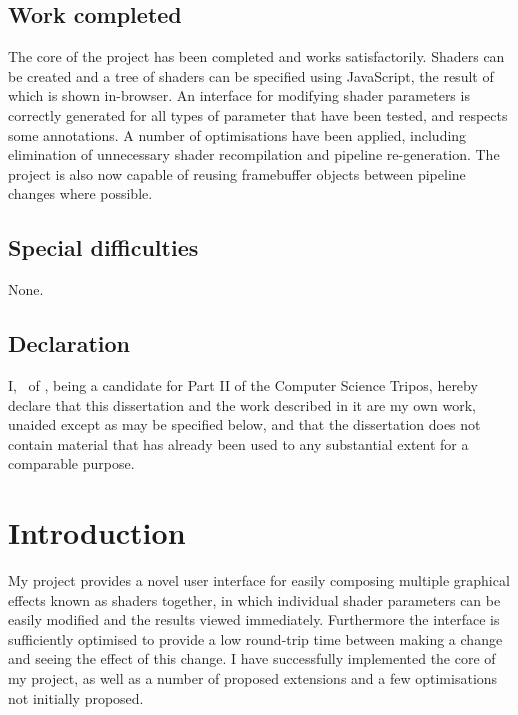 \documentclass[12pt,twoside,notitlepage]{report}
\begin{document}
\section*{Work completed}
The core of the project has been completed and works satisfactorily. Shaders can be created and a tree of shaders can be specified using JavaScript, the result of which is shown in-browser. An interface for modifying shader parameters is correctly generated for all types of parameter that have been tested, and respects some annotations. A number of optimisations have been applied, including elimination of unnecessary shader recompilation and pipeline re-generation. The project is also now capable of reusing framebuffer objects between pipeline changes where possible.

\section*{Special difficulties}
None.
 
\newpage
\section*{Declaration}

I, \name \ of \college, being a candidate for Part II of the Computer
Science Tripos, hereby declare
that this dissertation and the work described in it are my own work,
unaided except as may be specified below, and that the dissertation
does not contain material that has already been used to any substantial
extent for a comparable purpose.

\bigskip
{}

\medskip
{}

\cleardoublepage

\tableofcontents


\cleardoublepage        %


\chapter{Introduction}
My project provides a novel user interface for easily composing multiple graphical effects known as shaders together, in which individual shader parameters can be easily modified and the results viewed immediately. Furthermore the interface is sufficiently optimised to provide a low round-trip time between making a change and seeing the effect of this change. I have successfully implemented the core of my project, as well as a number of proposed extensions and a few optimisations not initially proposed.
\end{document}
